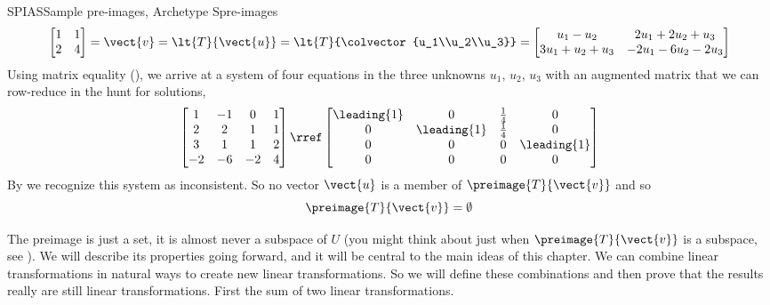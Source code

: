 \begin{example}{SPIAS}{Sample pre-images, Archetype S}{pre-images}
%
\begin{equation*}
\begin{bmatrix}
1&1\\2&4
\end{bmatrix}
=\vect{v}
=\lt{T}{\vect{u}}
=\lt{T}{\colvector{u_1\\u_2\\u_3}}\\
=\begin{bmatrix}
u_1-u_2&2u_1+2u_2+u_3\\
3u_1+u_2+u_3&-2u_1-6u_2-2u_3
\end{bmatrix}
\end{equation*}
%
Using matrix equality (), we arrive at a system of four equations in the three unknowns $u_1,\,u_2,\,u_3$ with an augmented matrix that we can row-reduce in the hunt for solutions,
%
\begin{equation*}
\begin{bmatrix}
1 & -1 & 0 & 1\\
2 & 2 & 1 & 1\\
3 & 1 & 1 & 2\\
-2 & -6 & -2 & 4
\end{bmatrix}
\rref
\begin{bmatrix}
\leading{1} & 0 & \frac{1}{4} &  0\\
0 & \leading{1} & \frac{1}{4} &  0\\
0 & 0 & 0 &  \leading{1}\\
0 & 0 & 0 &  0
\end{bmatrix}
\end{equation*}
%
By  we recognize this system as inconsistent.  So no vector $\vect{u}$ is a member of $\preimage{T}{\vect{v}}$ and so
%
\begin{equation*}
\preimage{T}{\vect{v}}=\emptyset
\end{equation*}
%
\end{example}
%
The preimage is just a set, it is almost never a subspace of $U$ (you might think about just when $\preimage{T}{\vect{v}}$ is a subspace, see ).  We will describe its properties going forward, and it will be central to the main ideas of this chapter.
%
%
%
We can combine linear transformations in natural ways to create new linear transformations.  So we will define these combinations and then prove that the results really are still linear transformations.  First the sum of two linear transformations.
